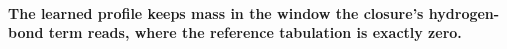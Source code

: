 \paragraph{The learned profile keeps mass in the window the closure's hydrogen-bond term
reads, where the reference tabulation is exactly zero.}
